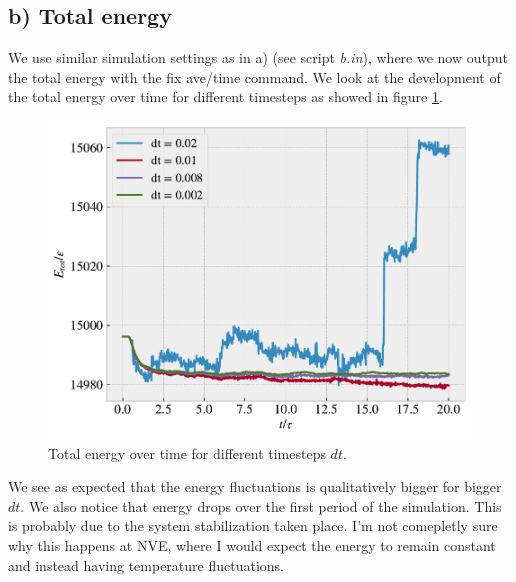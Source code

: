 \documentclass[reprint, amsmath, amssymb, aps]{revtex4-2}
\begin{document}
\subsection*{b) Total energy}
We use similar simulation settings as in a) (see script \textit{b.in}), where we now output the total energy with the fix ave/time command. We look at the development of the total energy over time for different timesteps as showed in figure \ref{fig:etotal}.
\begin{figure}[H]
  \includegraphics[width=\linewidth]{figures/Etot.pdf}
  \caption{Total energy over time for different timesteps $dt$.}
  \label{fig:etotal}
\end{figure}
We see as expected that the energy fluctuations is qualitatively bigger for bigger $dt$. We also notice that energy drops over the first period of the simulation. This is probably due to the system stabilization taken place. I'm not comepletly sure why this happens at NVE, where I would expect the energy to remain constant and instead having temperature fluctuations.

%
%
\end{document}
